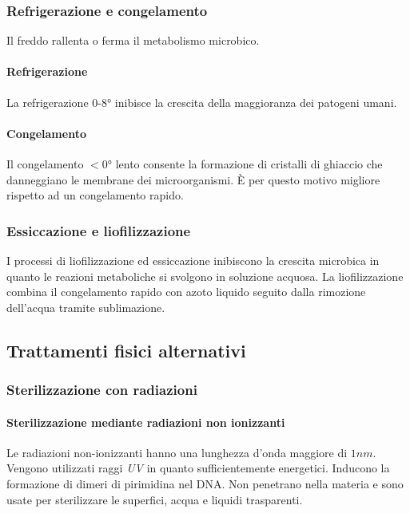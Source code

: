 		\subsubsection{Refrigerazione e congelamento}
		Il freddo rallenta o ferma il metabolismo microbico.
			
			\paragraph{Refrigerazione}
			La refrigerazione $0$-$8\si{\degree}$ inibisce la crescita della maggioranza dei patogeni umani.

			\paragraph{Congelamento}
			Il congelamento $<0\si{\degree}$ lento consente la formazione di cristalli di ghiaccio che danneggiano le membrane dei microorganismi.
			\`E per questo motivo migliore rispetto ad un congelamento rapido.

		\subsubsection{Essiccazione e liofilizzazione}
		I processi di liofilizzazione ed essiccazione inibiscono la crescita microbica in quanto le reazioni metaboliche si svolgono in soluzione acquosa.
		La liofilizzazione combina il congelamento rapido con azoto liquido seguito dalla rimozione dell'acqua tramite sublimazione.

	\subsection{Trattamenti fisici alternativi}

		\subsubsection{Sterilizzazione con radiazioni}

			\paragraph{Sterilizzazione mediante radiazioni non ionizzanti}
			Le radiazioni non-ionizzanti hanno una lunghezza d'onda maggiore di $1 nm$.
			Vengono utilizzati raggi \emph{UV} in quanto sufficientemente energetici.
			Inducono la formazione di dimeri di pirimidina nel DNA.
			Non penetrano nella materia e sono usate per sterilizzare le superfici, acqua e liquidi trasparenti.

